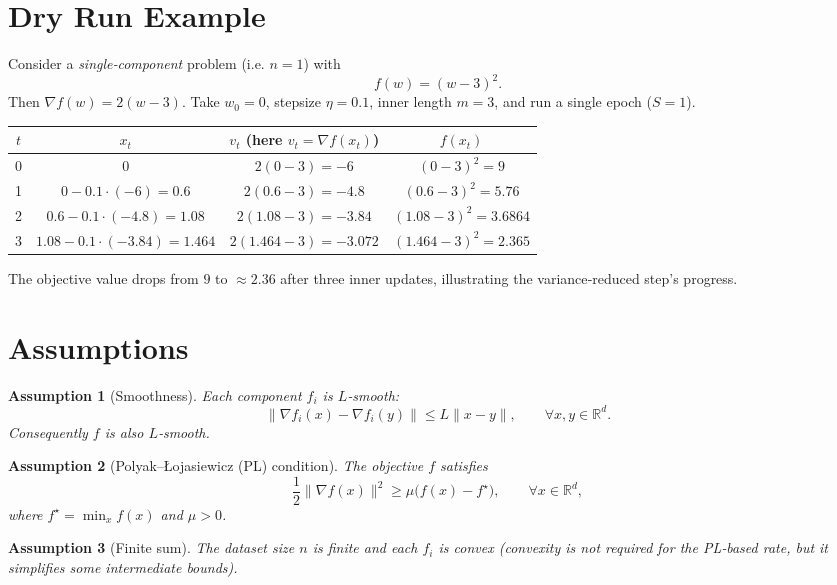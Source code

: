 \documentclass{article}
\newtheorem{assumption}{Assumption}[section]
\begin{document}
\section*{Dry Run Example}
Consider a \emph{single‑component} problem (i.e. $n=1$) with
\[
f(w)=(w-3)^2 .
\]
Then $\nabla f(w)=2(w-3)$.  
Take $w_0=0$, stepsize $\eta=0.1$, inner length $m=3$, and run a single epoch ($S=1$).

\begin{center}
\begin{tabular}{c|c|c|c}
$t$ & $x_t$ & $v_t$ (here $v_t=\nabla f(x_t)$) & $f(x_t)$\\ \hline
0 & $0$ & $2(0-3)=-6$ & $(0-3)^2=9$\\
1 & $0-0.1\cdot(-6)=0.6$ & $2(0.6-3)=-4.8$ & $(0.6-3)^2=5.76$\\
2 & $0.6-0.1\cdot(-4.8)=1.08$ & $2(1.08-3)=-3.84$ & $(1.08-3)^2=3.6864$\\
3 & $1.08-0.1\cdot(-3.84)=1.464$ & $2(1.464-3)=-3.072$ & $(1.464-3)^2=2.365$\\
\end{tabular}
\end{center}
The objective value drops from $9$ to $\approx2.36$ after three inner updates, illustrating the variance‑reduced step’s progress.

\section*{Assumptions}
\begin{assumption}[Smoothness]\label{ass:smooth}
Each component $f_i$ is $L$‑smooth:
\[
\|\nabla f_i(x)-\nabla f_i(y)\|\le L\|x-y\|,\qquad\forall x,y\in\mathbb{R}^d .
\]
Consequently $f$ is also $L$‑smooth.
\end{assumption}

\begin{assumption}[Polyak–\L{}ojasiewicz (PL) condition]\label{ass:pl}
The objective $f$ satisfies
\[
\frac{1}{2}\|\nabla f(x)\|^{2}\ge \mu\bigl(f(x)-f^{\star}\bigr),\qquad\forall x\in\mathbb{R}^d,
\]
where $f^{\star}= \min_{x}f(x)$ and $\mu>0$.
\end{assumption}

\begin{assumption}[Finite sum]\label{ass:finite}
The dataset size $n$ is finite and each $f_i$ is convex (convexity is not required for the PL‑based rate, but it simplifies some intermediate bounds).
\end{assumption}
\end{document}
